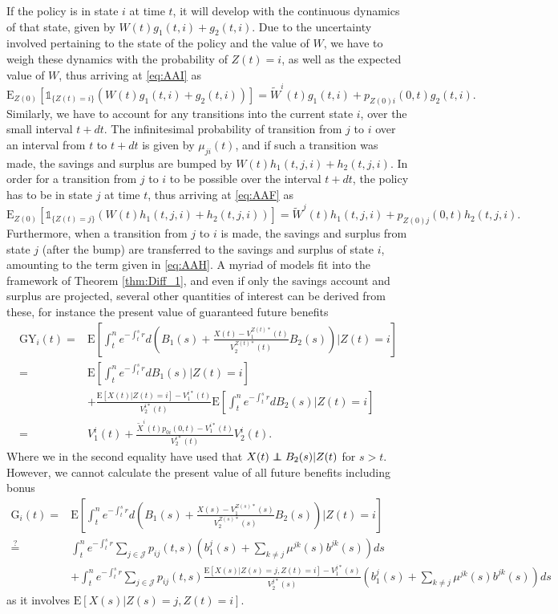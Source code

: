\documentclass[12pt]{article}
\newcommand{\E}{\text{E}}
\newcommand{\indic}[1]{\mathds{1}_{ \{ #1 \} }}
\newcommand\independent{\protect\mathpalette{\protect\independenT}{\perp}}
\def\independenT#1#2{\mathrel{\rlap{$#1#2$}\mkern2mu{#1#2}}}
\theoremstyle{my_thm}
\begin{document}
If the policy is in state $i$ at time $t$, it will develop with the continuous dynamics of that state, given by $W(t)g_1(t,i)+g_2(t,i)$. Due to the uncertainty involved pertaining to the state of the policy and the value of $W$, we have to weigh these dynamics with the probability of $Z(t)=i$, as well as the expected value of $W$, thus arriving at \eqref{eq:AAI} as
$$
\E_{Z(0)} [\indic{Z(t)=i} \left(W(t)g_1(t,i)+g_2(t,i)\right)]= \tilde{W}^i(t)g_1(t,i)+p_{Z(0)i}(0,t)g_2(t,i).
$$
Similarly, we have to account for any transitions into the current state $i$, over the small interval $t+dt$. The infinitesimal probability of transition from $j$ to $i$ over an interval from $t$ to $t+dt$ is given by $\mu_{ji}(t)$, and if such a transition was made, the savings and surplus are bumped by $W(t)h_1(t,j,i)+h_2(t,j,i)$. In order for a transition from $j$ to $i$ to be possible over the interval $t+dt$, the policy has to be in state $j$ at time $t$, thus arriving at 
\eqref{eq:AAF} as
$$
\E_{Z(0)}[ \indic{Z(t)=j} \left( W(t)h_1(t,j,i)+ h_2(t,j,i)\right)]=\tilde{W}^j(t) h_1(t,j,i)+ p_{Z(0)j}(0,t)h_2(t,j,i).
$$
Furthermore, when a transition from $j$ to $i$ is made, the savings and surplus from state $j$ (after the bump) are transferred to the savings and surplus of state $i$, amounting to the term given in \eqref{eq:AAH}. A myriad of models fit into the framework of Theorem \ref{thm:Diff_1}, and even if only the savings account and surplus are projected, several other quantities of interest can be derived from these, for instance the present value of guaranteed future benefits
\begin{align*}
\text{GY}_i(t)=&\E \left[ \int_t^n e^{-\int_t^s r} d \left( B_1(s)+\frac{X(t)-V_1^{Z(t)*}(t)}{V_2^{Z(t)*}(t)}B_2(s) \right) \big|Z(t)=i\right]
\\
=&
\E \left[ \int_t^n e^{-\int_t^s r} d B_1(s) \big| Z(t)=i \right]
\\
&+ \frac{\E[X(t)|Z(t)=i]-V_1^{i*}(t)}{V_2^{i*}(t)}  \E \left[ \int_t^n e^{-\int_t^s r} dB_2(s) \big|Z(t)=i\right]
\\
=&
V_1^i(t)+\frac{\tilde{X}^{i}(t)p_{0i}(0,t)-V_1^{i*}(t)}{V_2^{i*}(t)}V_2^i(t).
\end{align*}
Where we in the second equality have used that $X(t)\independent B_2(s)|Z(t)$ for $s>t$.
However, we cannot calculate the present value of all future benefits including bonus
\begin{align*}
\text{G}_i(t)=&\E \left[ \int_t^n e^{-\int_t^s r} d \left( B_1(s)+\frac{X(s)-V_1^{Z(s)*}(s)}{V_2^{Z(s)*}(s)}B_2(s) \right) \big|Z(t)=i \right]
\\
\overset{?}{=}&
\int_t^n e^{-\int_t^s r} \sum_{j \in \mathcal{J}} p_{ij}(t,s) \left( b_1^j(s)+ \sum_{k\neq j} \mu^{jk}(s) b^{jk}(s)  \right) ds
\\
&+
\int_t^n e^{-\int_t^s r} \sum_{j \in \mathcal{J}} p_{ij}(t,s) \frac{\E[X(s)|Z(s)=j,Z(t)=i]-V_1^{j*}(s)}{V_2^{j*}(s)}\left( b_1^j(s)+ \sum_{k\neq j} \mu^{jk}(s) b^{jk}(s)  \right) ds
\end{align*}
as it involves $\E[X(s)|Z(s)=j,Z(t)=i]$.
\newpage
\end{document}
